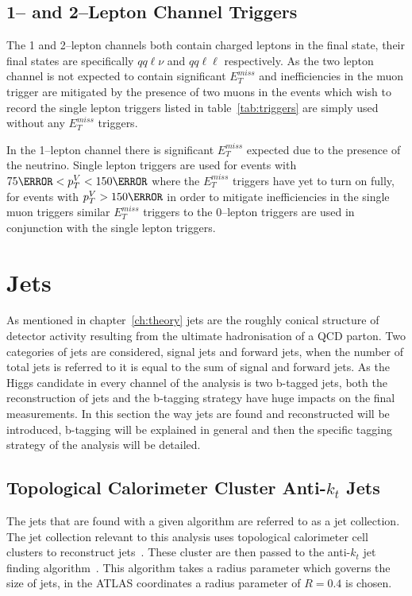\subsection{1-- and 2--Lepton Channel Triggers}
The 1 and 2--lepton channels both contain charged leptons in the final state,
their final states are specifically $qq\ell\nu$ and $qq\ell\ell$ respectively.
As the two lepton channel is not expected to contain significant $E_T^{miss}$
and inefficiencies in the muon trigger are mitigated by the presence of two
muons in the events which wish to record the single lepton triggers listed in
table~\ref{tab:triggers} are simply used without any $E_T^{miss}$ triggers.

In the 1--lepton channel there is significant $E_T^{miss}$ expected due to the
presence of the neutrino. Single lepton triggers are used for events with $75
\GeV < p_T^{V} < 150 \GeV$ where the $E_T^{miss}$ triggers have yet to turn on
fully, for events with $p_T^{V} > 150 \GeV$ in order to mitigate inefficiencies
in the single muon triggers similar $E_T^{miss}$ triggers to the 0--lepton
triggers are used in conjunction with the single lepton triggers.


\section{Jets}
\label{sec:jets}

As mentioned in chapter~\ref{ch:theory} jets are the roughly conical structure
of detector activity resulting from the ultimate hadronisation of a QCD parton.
Two categories of jets are considered, signal jets and forward jets, when the
number of total jets is referred to it is equal to the sum of signal and forward
jets. As the Higgs candidate in every channel of the analysis is two b-tagged
jets, both the reconstruction of jets and the b-tagging strategy have huge
impacts on the final measurements. In this section the way jets are found and
reconstructed will be introduced, b-tagging will be explained in general and
then the specific tagging strategy of the analysis will be detailed.

\subsection{Topological Calorimeter Cluster Anti-$k_t$ Jets}
The jets that are found with a given algorithm are referred to as a jet
collection. The jet collection relevant to this analysis uses topological
calorimeter cell clusters to reconstruct jets~\cite{CALO2008}. These cluster are
then passed to the anti-$k_t$ jet finding algorithm~\cite{anti-kt}. This
algorithm takes a radius parameter which governs the size of jets, in the ATLAS
coordinates a radius parameter of $R=0.4$ is chosen.

